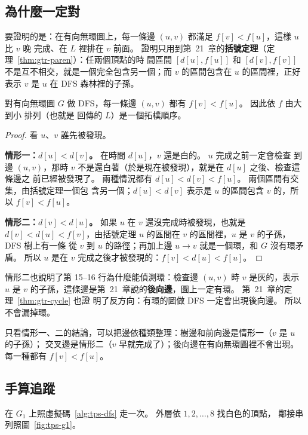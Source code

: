 \subsection{為什麼一定對}

要證明的是：在有向無環圖上，每一條邊 $(u, v)$ 都滿足 $f[v] < f[u]$，這樣 $u$ 比 $v$ 晚
完成、在 $L$ 裡排在 $v$ 前面。 證明只用到第~21~章的\textbf{括號定理}（定理~\ref{thm:gtr-paren}）：任兩個頂點的時
間區間 $[d[u], f[u]]$ 和 $[d[v], f[v]]$ 不是互不相交，就是一個完全包含另一個；而
$v$ 的區間包含在 $u$ 的區間裡，正好表示 $v$ 是 $u$ 在 DFS 森林裡的子孫。

\begin{theorem}
\label{thm:tps-dfs}
對有向無環圖 $G$ 做 DFS，每一條邊 $(u, v)$ 都有 $f[v] < f[u]$。 因此依 $f$ 由大到小
排列（也就是  回傳的 $L$）是一個拓樸順序。
\end{theorem}

\begin{proof}
看 $u$、$v$ 誰先被發現。

\textbf{情形一：$d[u] < d[v]$。} 在時間 $d[u]$，$v$ 還是白的。 $u$ 完成之前一定會檢查
到邊 $(u, v)$，那時 $v$ 不是還白著（於是現在被發現），就是在 $d[u]$ 之後、檢查這條邊之
前已經被發現了。 兩種情況都有 $d[u] < d[v] < f[u]$。 兩個區間有交集，由括號定理一個包
含另一個；$d[u] < d[v]$ 表示是 $u$ 的區間包含 $v$ 的，所以 $f[v] < f[u]$。

\textbf{情形二：$d[v] < d[u]$。} 如果 $u$ 在 $v$ 還沒完成時被發現，也就是 $d[v] <
d[u] < f[v]$，由括號定理 $u$ 的區間在 $v$ 的區間裡，$u$ 是 $v$ 的子孫，DFS 樹上有一條
從 $v$ 到 $u$ 的路徑；再加上邊 $u \to v$ 就是一個環，和 $G$ 沒有環矛盾。 所以 $u$ 是在
$v$ 完成之後才被發現的：$f[v] < d[u] < f[u]$。
\end{proof}

情形二也說明了第 15--16 行為什麼能偵測環：檢查邊 $(u, v)$ 時 $v$ 是灰的，表示 $u$ 是
$v$ 的子孫，這條邊是第~21~章說的\textbf{後向邊}，圖上一定有環。 第~21~章的定理~\ref{thm:gtr-cycle} 也證
明了反方向：有環的圖做 DFS 一定會出現後向邊。 所以  不會漏掉環。

只看情形一、二的結論，可以把邊依種類整理：樹邊和前向邊是情形一（$v$ 是 $u$ 的子孫）；
交叉邊是情形二（$v$ 早就完成了）；後向邊在有向無環圖裡不會出現。 每一種都有
$f[v] < f[u]$。

\subsection{手算追蹤}

在 $G_1$ 上照虛擬碼~\ref{alg:tps-dfs} 走一次。 外層依 $1, 2, \ldots, 8$ 找白色的頂點，
鄰接串列照圖~\ref{fig:tps-g1}。

